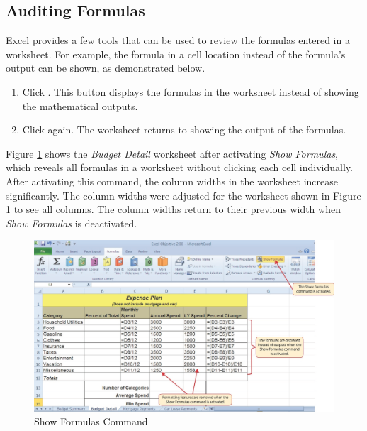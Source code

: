 \subsection{Auditing Formulas}

Excel provides a few tools that can be used to review the formulas entered in a worksheet. For example, the formula in a cell location instead of the formula’s output can be shown, as demonstrated below.

\begin{enumbox}
	\begin{enumerate}
		\item Click . This button displays the formulas in the worksheet instead of showing the mathematical outputs.
		\item Click  again. The worksheet returns to showing the output of the formulas.
	\end{enumerate}
\end{enumbox}

Figure \ref{02:fig08} shows the \textit{Budget Detail} worksheet after activating \textit{Show Formulas}, which reveals all formulas in a worksheet without clicking each cell individually. After activating this command, the column widths in the worksheet increase significantly. The column widths were adjusted for the worksheet shown in Figure \ref{02:fig08} to see all columns. The column widths return to their previous width when \textit{Show Formulas} is deactivated.

\begin{figure}[H]
	\centering
	\includegraphics[width=\maxwidth{.95\linewidth}]{gfx/ch02_fig08}
	\caption{Show Formulas Command}
	\label{02:fig08}
\end{figure}

